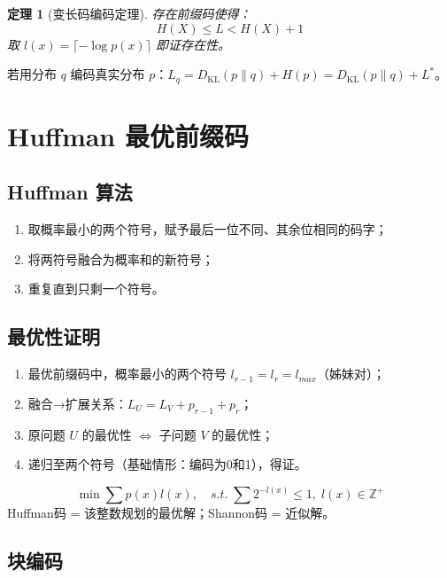\documentclass[12pt,a4paper]{ctexart}
\newtheorem{theorem}{定理}[section]
\theoremstyle{definition}
\newcommand{\DKL}{D_{\mathrm{KL}}}
\begin{document}
\begin{theorem}[变长码编码定理]
存在前缀码使得：
\[
H(X) \leq L < H(X) + 1
\]
取 $l(x) = \lceil -\log p(x) \rceil$ 即证存在性。
\end{theorem}

若用分布 $q$ 编码真实分布 $p$：$L_q = \DKL(p\|q) + H(p) = \DKL(p\|q) + L^*$。

\section{Huffman 最优前缀码}

\subsection{Huffman 算法}

\begin{enumerate}[nosep]
  \item 取概率最小的两个符号，赋予最后一位不同、其余位相同的码字；
  \item 将两符号融合为概率和的新符号；
  \item 重复直到只剩一个符号。
\end{enumerate}

\subsection{最优性证明}

\begin{enumerate}[nosep]
  \item 最优前缀码中，概率最小的两个符号 $l_{r-1} = l_r = l_{max}$（姊妹对）；
  \item 融合→扩展关系：$L_U = L_V + p_{r-1} + p_r$；
  \item 原问题 $U$ 的最优性 $\Leftrightarrow$ 子问题 $V$ 的最优性；
  \item 递归至两个符号（基础情形：编码为0和1），得证。
\end{enumerate}

\begin{keybox}[整数约束优化]
\[
\min \sum p(x) l(x), \quad s.t. \; \sum 2^{-l(x)} \leq 1,\; l(x) \in \mathbb{Z}^+
\]
Huffman码 = 该整数规划的最优解；Shannon码 = 近似解。
\end{keybox}

\subsection{块编码}
\end{document}
